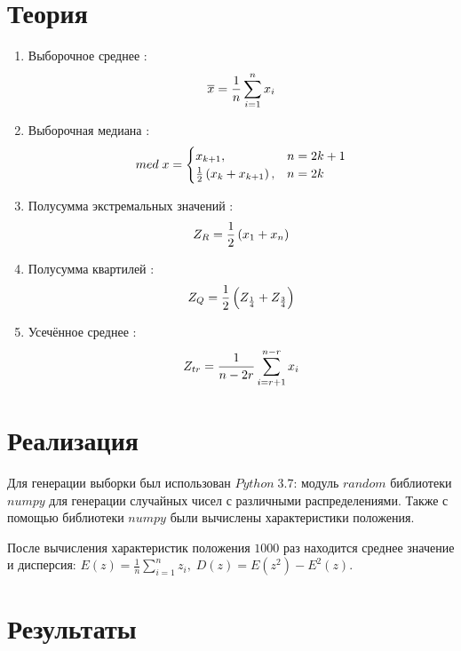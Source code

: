 \documentclass[a4]{article}
\begin{document}
\section{Теория}

\begin{enumerate}
\item Выборочное среднее \cite{average}:
\begin{equation}\label{eqn:average}
\overline{x} = \frac{1}{n}\sum_{i=1}^n x_i \hfill  
\end{equation}
\item Выборочная медиана \cite{med}:
\begin{equation}
med\; x = \begin{cases}
x_{k+1}, & n = 2k+1\\
\frac{1}{2}\left(x_k+x_{k+1}\right), & n = 2k
\end{cases} \hfill  \label{eqn:med}
\end{equation}
\item Полусумма экстремальных значений \cite{mean_extr}:
\begin{equation}
Z_R = \frac{1}{2}\left(x_1+x_n\right) \hfill  \label{eqn:mean_extr}
\end{equation}
\item Полусумма квартилей \cite{quartiles}:
\begin{equation}
Z_Q = \frac{1}{2}\left(Z_{\frac{1}{4}}+Z_{\frac{3}{4}}\right) \hfill  \label{eqn:quartiles}
\end{equation}
\item Усечённое среднее \cite{cut_mean}:
\begin{equation}
Z_{tr} = \frac{1}{n - 2r}\sum_{i=r+1}^{n-r} x_i \hfill  \label{eqn:cut_mean}
\end{equation}
\end{enumerate}

\section{Реализация}
Для генерации выборки был использован $Python\;3.7$: модуль $random$ библиотеки $numpy$ \cite{numpy} для генерации случайных чисел с различными распределениями. Также с помощью библиотеки $numpy$ были вычислены характеристики положения.

После вычисления характеристик положения $1000$ раз находится среднее значение и дисперсия: $E(z) = \frac{1}{n}\sum_{i=1}^n z_i,\; D(z) = E\left(z^2\right) - E^2(z).$

\newpage
\section{Результаты}
\end{document}
